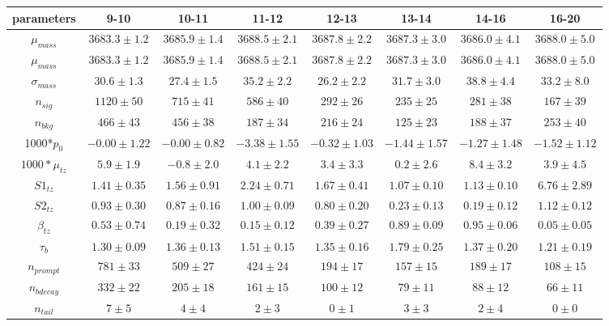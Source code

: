 \begin{sidewaystable}[h]
\begin{center}
{\begin{tabular}{c|ccccccc}
\hline
parameters  & 9-10 & 10-11 & 11-12 & 12-13 & 13-14 &  14-16 & 16-20  \\ \hline
$\mu_{mass}$  & $3683.3\pm1.2$ & $3685.9\pm1.4$ & $3688.5\pm2.1$ & $3687.8\pm2.2$ & $3687.3\pm3.0$ & $3686.0\pm4.1$ & $3688.0\pm5.0$\\
$\mu_{mass}$  & $3683.3\pm1.2$ & $3685.9\pm1.4$ & $3688.5\pm2.1$ & $3687.8\pm2.2$ & $3687.3\pm3.0$ & $3686.0\pm4.1$ & $3688.0\pm5.0$\\
$\sigma_{mass}$  & $30.6\pm1.3$ & $27.4\pm1.5$ & $35.2\pm2.2$ & $26.2\pm2.2$ & $31.7\pm3.0$ & $38.8\pm4.4$ & $33.2\pm8.0$\\
$n_{sig}$  & $1120\pm50$ & $715\pm41$ & $586\pm40$ & $292\pm26$ & $235\pm25$ & $281\pm38$ & $167\pm39$\\
$n_{bkg}$  & $466\pm43$ & $456\pm38$ & $187\pm34$ & $216\pm24$ & $125\pm23$ & $188\pm37$ & $253\pm40$\\
1000*$p_{0}$  & $-0.00\pm1.22$ & $-0.00\pm0.82$ & $-3.38\pm1.55$ & $-0.32\pm1.03$ & $-1.44\pm1.57$ & $-1.27\pm1.48$ & $-1.52\pm1.12$\\
$1000*\mu_{tz}$  & $5.9\pm1.9$ & $-0.8\pm2.0$ & $4.1\pm2.2$ & $3.4\pm3.3$ & $0.2\pm2.6$ & $8.4\pm3.2$ & $3.9\pm4.5$\\
$S1_{tz}$  & $1.41\pm0.35$ & $1.56\pm0.91$ & $2.24\pm0.71$ & $1.67\pm0.41$ & $1.07\pm0.10$ & $1.13\pm0.10$ & $6.76\pm2.89$\\
$S2_{tz}$  & $0.93\pm0.30$ & $0.87\pm0.16$ & $1.00\pm0.09$ & $0.80\pm0.20$ & $0.23\pm0.13$ & $0.19\pm0.12$ & $1.12\pm0.12$\\
$\beta_{tz}$  & $0.53\pm0.74$ & $0.19\pm0.32$ & $0.15\pm0.12$ & $0.39\pm0.27$ & $0.89\pm0.09$ & $0.95\pm0.06$ & $0.05\pm0.05$\\
$\tau_{b}$  & $1.30\pm0.09$ & $1.36\pm0.13$ & $1.51\pm0.15$ & $1.35\pm0.16$ & $1.79\pm0.25$ & $1.37\pm0.20$ & $1.21\pm0.19$\\
$n_{prompt}$  & $781\pm33$ & $509\pm27$ & $424\pm24$ & $194\pm17$ & $157\pm15$ & $189\pm17$ & $108\pm15$\\
$n_{bdecay}$  & $332\pm22$ & $205\pm18$ & $161\pm15$ & $100\pm12$ & $79\pm11$ & $88\pm12$ & $66\pm11$\\
$n_{tail}$  & $7\pm5$ & $4\pm4$ & $2\pm3$ & $0\pm1$ & $3\pm3$ & $2\pm4$ & $0\pm0$\\
\hline
\end{tabular}
}
\end{center} 
\end{sidewaystable}  





